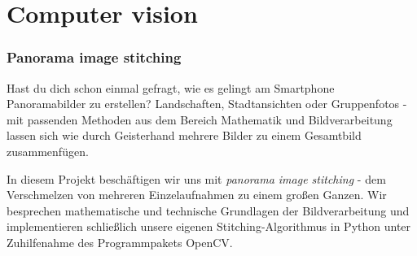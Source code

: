 \documentclass[a4paper, headsepline, halfparskip, fleqn, 10pt]{scrartcl}
\begin{document}
    \section*{Computer vision}
    \subsubsection*{Panorama image stitching}

    Hast du dich schon einmal gefragt, wie es gelingt am Smartphone Panoramabilder zu erstellen? Landschaften, 
		Stadtansichten oder Gruppenfotos - mit passenden Methoden aus dem Bereich Mathematik und Bildverarbeitung lassen sich wie durch 
		Geisterhand mehrere Bilder zu einem Gesamtbild zusammenf{\"u}gen.

		In diesem Projekt besch{\"a}ftigen wir uns mit \textit{panorama image stitching} - dem Verschmelzen von mehreren Einzelaufnahmen
		zu einem gro{\ss}en Ganzen. Wir besprechen mathematische und technische Grundlagen der Bildverarbeitung und implementieren 
		schlie{\ss}lich unsere eigenen Stitching-Algorithmus in Python unter Zuhilfenahme des Programmpakets OpenCV.
		
\end{document}
